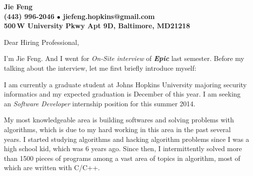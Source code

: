 \documentclass[11pt]{letter}
\newcommand{\company}{\emph{Epic}}
\newcommand{\job}{\emph{Software Developer}}
\begin{document}
\begin{letter}{
} 

\begin{center}
\large\bf Jie Feng \\ %
 (443) 996-2046 $\bullet$ jiefeng.hopkins@gmail.com \\%
500\,W University Pkwy Apt 9D, Baltimore, MD21218 
\end{center} 
\date{}
\signature{Jie Feng} %

\vspace*{-40pt}
\opening{Dear Hiring Professional,} 
I'm Jie Feng. And I went for \emph{On-Site interview} of \textbf{\company} last semester.  Before my talking about the interview, let me first briefly introduce myself:

I am currently a graduate student at Johns Hopkins University majoring security informatics and my expected graduation is December of this year.
I am seeking an \job{} internship position for this summer 2014.  




My most knowledgeable area is building softwares and solving problems with algorithms, which is due to my hard working
in this area in the past several years.  
I started studying algorithms and hacking algorithm problems since I was a high school kid, which was 6 years ago. 
Since then, I intermittently solved more than 1500 pieces of programs among a vast area of topics in algorithm, most of which are written with C/C++.


\end{letter}
\end{document}

